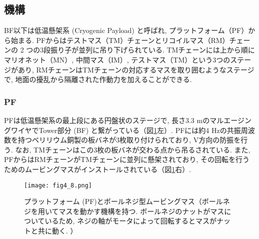\subsection{機構}
BF以下は低温懸架系 (Cryogenic Payload) と呼ばれ, プラットフォーム（PF）から始まる. PFからはテストマス（TM）チェーンとリコイルマス（RM）チェーンの 2 つの3段振り子が並列に吊り下げられている. TMチェーンには上から順にマリオネット（MN）, 中間マス（IM）, テストマス（TM）という3つのステージがあり, RMチェーンはTMチェーンの対応するマスを取り囲むようなステージで, 地面の擾乱から隔離された作動力を加えることができる. 
\subsubsection{PF}
\vskip3mm
PFは低温懸架系の最上段にある円盤状のステージで, 長さ3.3 mのマルエージングワイヤでTower部分 (BF) と繋がっている（図\ref{fig4.8}左）. PFには約4 Hzの共振周波数を持つベリリウム銅製の板バネが3枚取り付けられており, V方向の防振を行う. なお, TMチェーンはこの3枚の板バネが交わる点から吊るされている. また, PFからはRMチェーンがTMチェーンに並列に懸架されており, その回転を行うためのムービングマスがインストールされている（図\ref{fig4.8}右）. 
\begin{figure}[H]
\begin{center}
\texttt{[image: fig4\_8.png]} 
\caption[プラットフォーム (PF)とボールネジ型ムービングマス]{プラットフォーム (PF)とボールネジ型ムービングマス（ボールネジを用いてマスを動かす機構を持つ. ボールネジのナットがマスについているため, ネジの軸がモータによって回転するとマスがナットと共に動く. ）\cite{42}}
\label{fig4.8}
\end{center}
\end{figure}
